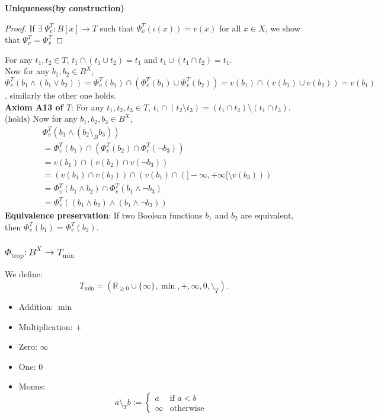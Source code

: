 \textbf{Uniqueness(by construction)}
\begin{proof}
If $\exists\;\Psi_v^T:B[x]\rightarrow T$ such that $\Psi_v^T(\iota(x))=v(x)\text{ for all }x \in X$, we show that $\Psi_v^T=\Phi_v^T$
\end{proof}
For any $t_1,t_2 \in T$, $t_1 \cap (t_1 \cup t_2) = t_1$ and $t_1 \cup (t_1 \cap t_2) = t_1$.\\
Now for any $b_1,b_2 \in B^X$, $\Phi_v^T(b_1 \wedge (b_1 \lor b_2)) = \Phi_v^T(b_1) \cap (\Phi_v^T(b_1) \cup \Phi_v^T(b_2)) = v(b_1) \cap (v(b_1) \cup v(b_2)) = v(b_1)$, similarly the other one holds.\\
\textbf{Axiom A13 of $T$}:\newline
For any $t_1,t_2,t_3 \in T$, $t_1 \cap (t_2 \setminus t_3) = (t_1 \cap t_2) \setminus (t_1 \cap t_3)$.\\ (holds)
Now for any $b_1, b_2, b_3 \in B^X$,
\[
\begin{aligned}
&\Phi_v^T(b_1 \wedge (b_2 \setminus_B b_3))\\ 
&= \Phi_v^T(b_1) \cap (\Phi_v^T(b_2) \cap \Phi_v^T(\neg b_3)) \\
&= v(b_1) \cap (v(b_2) \cap v(\neg b_3)) \\
&= (v(b_1) \cap v(b_2)) \cap (v(b_1) \cap (]-\infty,+\infty[ \setminus v(b_3))) \\
&= \Phi_v^T(b_1 \wedge b_2) \cap \Phi_v^T(b_1 \wedge \neg b_3) \\
&= \Phi_v^T((b_1 \wedge b_2) \wedge (b_1 \wedge \neg b_3))
\end{aligned}
\]
\textbf{Equivalence preservation}:\newline
If two Boolean functions $b_1$ and $b_2$ are equivalent, then $\Phi_v^T(b_1) = \Phi_v^T(b_2)$.



\subsubsection{$\Phi_{\mathrm{trop}}: B^X \to T_{\min}$}

We define:
$$
T_{\min} = (\mathbb{R}_{\ge 0} \cup \{\infty\},\min,+,\infty,0,\setminus_T).
$$
\begin{itemize}
    \item Addition: \(\min\)
    \item Multiplication: \(+\)
    \item Zero: \(\infty\)
    \item One: \(0\)
    \item Monus:
    \[
    a \setminus_T b :=
    \begin{cases}
        a & \text{if } a < b \\
        \infty & \text{otherwise}
    \end{cases}
    \]
\end{itemize}



